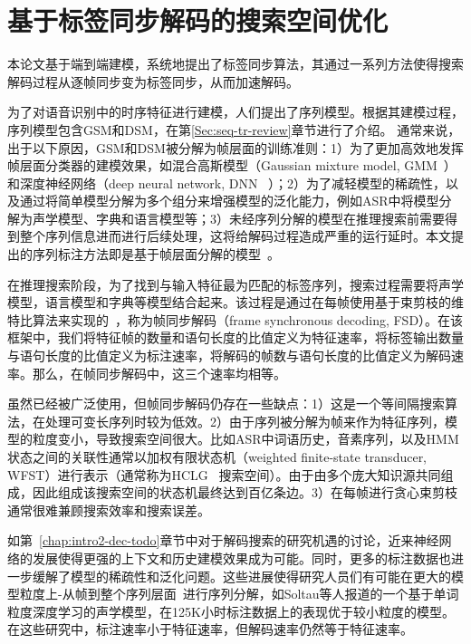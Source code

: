 
\chapter{基于标签同步解码的搜索空间优化}
\label{chap:lsd}

本论文基于端到端建模，系统地提出了标签同步算法，其通过一系列方法使得搜索解码过程从逐帧同步变为标签同步，从而加速解码。

为了对语音识别中的时序特征进行建模，人们提出了序列模型。根据其建模过程，序列模型包含GSM和DSM，在第\ref{Sec:seq-tr-review}章节进行了介绍。
通常来说，出于以下原因，GSM和DSM被分解为帧层面的训练准则：1）为了更加高效地发挥帧层面分类器的建模效果，如混合高斯模型（Gaussian mixture model, GMM~\cite{woodland1994large}）和深度神经网络（deep neural network, DNN ~\cite{hinton2012deep}）；2）为了减轻模型的稀疏性，以及通过将简单模型分解为多个组分来增强模型的泛化能力，例如ASR中将模型分解为声学模型、字典和语言模型等；3）未经序列分解的模型在推理搜索前需要得到整个序列信息进而进行后续处理，这将给解码过程造成严重的运行延时。本文提出的序列标注方法即是基于帧层面分解的模型~\cite{forney1973viterbi,mohri2002weighted}。

在推理搜索阶段，为了找到与输入特征最为匹配的标签序列，搜索过程需要将声学模型，语言模型和字典等模型结合起来。该过程是通过在每帧使用基于束剪枝的维特比算法来实现的~\cite{forney1973viterbi}，称为帧同步解码（frame synchronous decoding, FSD）。在该框架中，我们将特征帧的数量和语句长度的比值定义为特征速率，将标签输出数量与语句长度的比值定义为标注速率，将解码的帧数与语句长度的比值定义为解码速率。那么，在帧同步解码中，这三个速率均相等。

虽然已经被广泛使用，但帧同步解码仍存在一些缺点：1）这是一个等间隔搜索算法，在处理可变长序列时较为低效。2）由于序列被分解为帧来作为特征序列，模型的粒度变小，导致搜索空间很大。比如ASR中词语历史，音素序列，以及HMM状态之间的关联性通常以加权有限状态机（weighted finite-state transducer, WFST）进行表示（通常称为HCLG~\cite{mohri2002weighted} 搜索空间）。由于由多个庞大知识源共同组成，因此组成该搜索空间的状态机最终达到百亿条边。3）在每帧进行贪心束剪枝通常很难兼顾搜索效率和搜索误差。

如第~\ref{chap:intro2-dec-todo}章节中对于解码搜索的研究机遇的讨论，近来神经网络的发展使得更强的上下文和历史建模效果成为可能\cite{sak2014long,qian2016very}。同时，更多的标注数据也进一步缓解了模型的稀疏性和泛化问题。这些进展使得研究人员们有可能在更大的模型粒度上-从帧到整个序列层面~\cite{amodei2015deep,soltau2016neural,collobert2016wav2letter,sak2015fast,chan2016end}进行序列分解，如Soltau等人报道的一个基于单词粒度深度学习的声学模型\cite{soltau2016neural}，在125K小时标注数据上的表现优于较小粒度的模型。在这些研究中，标注速率小于特征速率，但解码速率仍然等于特征速率。

